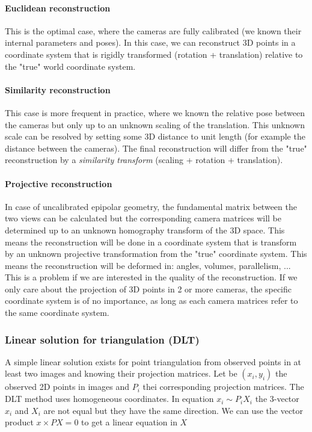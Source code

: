 \paragraph{Euclidean reconstruction}
This is the optimal case, where the cameras are fully calibrated (we known their internal parameters and poses). In this case, we can reconstruct 3D points in a coordinate system that is rigidly transformed (rotation + translation) relative to the "true" world coordinate system.

\paragraph{Similarity reconstruction}
This case is more frequent in practice, where we known the relative pose between the cameras but only up to an unknown scaling of the translation. This unknown scale can be resolved by setting some 3D distance to unit length (for example the distance between the cameras).
The final reconstruction will differ from the "true" reconstruction by a \textit{similarity transform} (scaling + rotation + translation).

\paragraph{Projective reconstruction}
In case of uncalibrated epipolar geometry, the fundamental matrix between the two views can be calculated but the corresponding camera matrices will be determined up to an unknown homography transform of the 3D space. This means the reconstruction will be done in a coordinate system that is transform by an unknown projective transformation from the "true" coordinate system. This means the reconstruction will be deformed in: angles, volumes, parallelism, ...
This is a problem if we are interested in the quality of the reconstruction. If we only care about the projection of 3D points in 2 or more cameras, the specific coordinate system is of no importance, as long as each camera matrices refer to the same coordinate system.

\subsubsection{Linear solution for triangulation (DLT)}

A simple linear solution exists for point triangulation from observed points in at least two images and knowing their projection matrices. Let be $(x_i, y_i)$ the observed 2D points in images and $P_i$ thei corresponding projection matrices.
The DLT method uses homogeneous coordinates. In equation $x_i \sim P_i X_i$ the 3-vector $x_i$ and $X_i$ are not equal but they have the same direction. We can use the vector product $x \times PX = 0$ to get a linear equation in $X$

